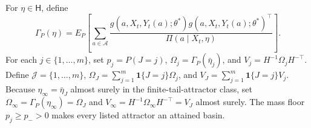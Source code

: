 For \(\eta\in\mathsf H\), define
\[
 \Gamma_P(\eta)=E_P\!\left[\sum_{a\in\mathcal A}
 \frac{g(a,X_t,Y_t(a);\theta^*)g(a,X_t,Y_t(a);\theta^*)^\top}
 {\Pi(a\mid X_t,\eta)}\right].
\]
For each \(j\in\{1,\ldots,m\}\), set \(p_j=P(J=j)\), \(\Omega_j=\Gamma_P(\bar\eta_j)\), and \(V_j=H^{-1}\Omega_jH^{-\top}\). Define \(\mathcal J=\{1,\ldots,m\}\), \(\Omega_J=\sum_{j=1}^m\mathbf 1\{J=j\}\Omega_j\), and \(V_J=\sum_{j=1}^m\mathbf 1\{J=j\}V_j\). Because \(\eta_\infty=\bar\eta_J\) almost surely in the finite-tail-attractor class, set \(\Omega_\infty=\Gamma_P(\eta_\infty)=\Omega_J\) and \(V_\infty=H^{-1}\Omega_\infty H^{-\top}=V_J\) almost surely. The mass floor \(p_j\ge p_->0\) makes every listed attractor an attained basin.